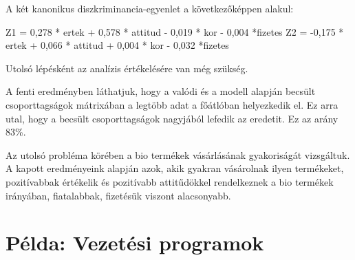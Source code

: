 \documentclass[
  letterpaper,
]{krantz}
\makeatletter
\newenvironment{Shaded}{\begin{snugshade}}{\end{snugshade}}
\newcommand{\AttributeTok}[1]{\textcolor[rgb]{0.40,0.45,0.13}{#1}}
\newcommand{\CommentTok}[1]{\textcolor[rgb]{0.37,0.37,0.37}{#1}}
\newcommand{\DecValTok}[1]{\textcolor[rgb]{0.68,0.00,0.00}{#1}}
\newcommand{\FunctionTok}[1]{\textcolor[rgb]{0.28,0.35,0.67}{#1}}
\newcommand{\NormalTok}[1]{\textcolor[rgb]{0.00,0.23,0.31}{#1}}
\newcommand{\OtherTok}[1]{\textcolor[rgb]{0.00,0.23,0.31}{#1}}
\newcommand{\SpecialCharTok}[1]{\textcolor[rgb]{0.37,0.37,0.37}{#1}}
\newcommand{\StringTok}[1]{\textcolor[rgb]{0.13,0.47,0.30}{#1}}
\newenvironment{kframe}{%
\medskip{}
\setlength{\fboxsep}{.8em}
 \def\at@end@of@kframe{}%
 \ifinner\ifhmode%
  \def\at@end@of@kframe{\end{minipage}}%
  \begin{minipage}{\columnwidth}%
 \fi\fi%
 \def\FrameCommand##1{\hskip\@totalleftmargin \hskip-\fboxsep
 \colorbox{shadecolor}{##1}\hskip-\fboxsep
     \hskip-\linewidth \hskip-\@totalleftmargin \hskip\columnwidth}%
 \MakeFramed {\advance\hsize-\width
   \@totalleftmargin\z@ \linewidth\hsize
   \@setminipage}}%
 {\par\unskip\endMakeFramed%
 \at@end@of@kframe}
\renewenvironment{Shaded}{\begin{kframe}}{\end{kframe}}
\makeatother
\begin{document}
A két kanonikus diszkriminancia-egyenlet a következőképpen alakul:

\begin{Shaded}
\begin{Highlighting}[]
\NormalTok{Z1 = 0,278 * ertek + 0,578 * attitud {-} 0,019 * kor {-} 0,004 *fizetes}
\NormalTok{Z2 = {-}0,175 * ertek + 0,066 * attitud + 0,004 * kor {-} 0,032 *fizetes}
\end{Highlighting}
\end{Shaded}

Utolsó lépésként az analízis értékelésére van még szükség.

\begin{Shaded}
\end{Shaded}

A fenti eredményben láthatjuk, hogy a valódi és a modell alapján becsült
csoporttagságok mátrixában a legtöbb adat a főátlóban helyezkedik el. Ez
arra utal, hogy a becsült csoporttagságok nagyjából lefedik az eredetit.
Ez az arány 83\%.

Az utolsó probléma körében a bio termékek vásárlásának gyakoriságát
vizsgáltuk. A kapott eredményeink alapján azok, akik gyakran vásárolnak
ilyen termékeket, pozitívabbak értékelik és pozitívabb attitűdökkel
rendelkeznek a bio termékek irányában, fiatalabbak, fizetésük viszont
alacsonyabb.

\hypertarget{puxe9lda-vezetuxe9si-programok}{%
\section{Példa: Vezetési
programok}\label{puxe9lda-vezetuxe9si-programok}}
\end{document}
